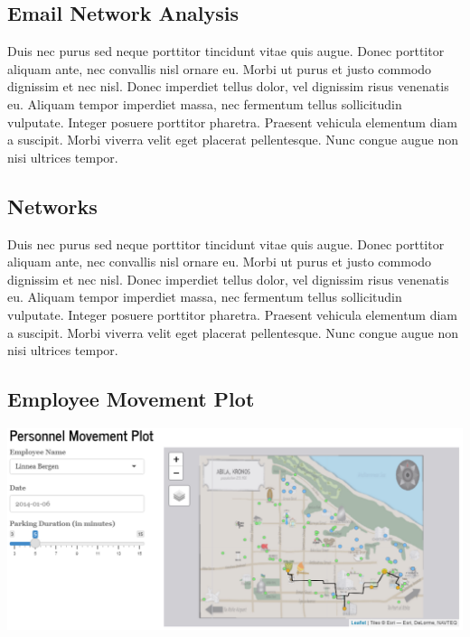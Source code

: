 \documentclass{acm_proc_article-sp}
\begin{document}
\hypertarget{email-network-analysis}{%
\subsection{Email Network Analysis}\label{email-network-analysis}}

Duis nec purus sed neque porttitor tincidunt vitae quis augue. Donec
porttitor aliquam ante, nec convallis nisl ornare eu. Morbi ut purus et
justo commodo dignissim et nec nisl. Donec imperdiet tellus dolor, vel
dignissim risus venenatis eu. Aliquam tempor imperdiet massa, nec
fermentum tellus sollicitudin vulputate. Integer posuere porttitor
pharetra. Praesent vehicula elementum diam a suscipit. Morbi viverra
velit eget placerat pellentesque. Nunc congue augue non nisi ultrices
tempor.

\hypertarget{networks}{%
\subsection{Networks}\label{networks}}

Duis nec purus sed neque porttitor tincidunt vitae quis augue. Donec
porttitor aliquam ante, nec convallis nisl ornare eu. Morbi ut purus et
justo commodo dignissim et nec nisl. Donec imperdiet tellus dolor, vel
dignissim risus venenatis eu. Aliquam tempor imperdiet massa, nec
fermentum tellus sollicitudin vulputate. Integer posuere porttitor
pharetra. Praesent vehicula elementum diam a suscipit. Morbi viverra
velit eget placerat pellentesque. Nunc congue augue non nisi ultrices
tempor.

\hypertarget{employee-movement-plot}{%
\subsection{Employee Movement Plot}\label{employee-movement-plot}}

\includegraphics{img/Movement.PNG}
\end{document}
